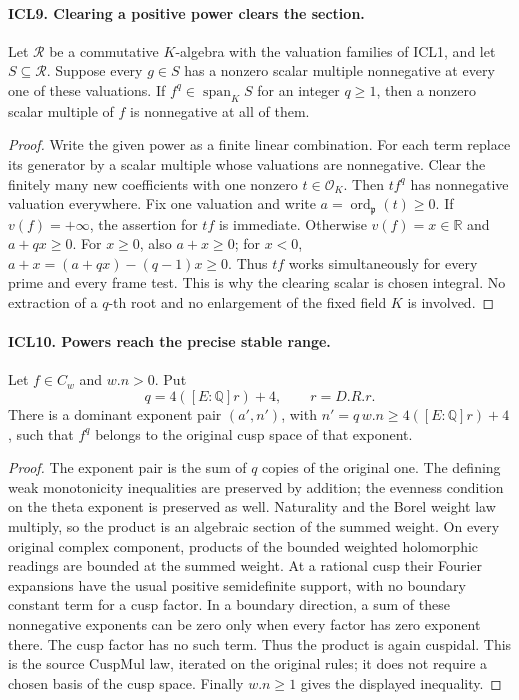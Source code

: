 \documentclass[11pt,a4paper]{article}
\numberwithin{equation}{section}
\theoremstyle{remark}\newtheorem{remark}[theorem]{Remark}
\begin{document}
\paragraph{ICL9. Clearing a positive power clears the section.}
\label{claim:ICL9}
Let \(\mathcal R\) be a commutative \(K\)-algebra with the
valuation families of ICL1, and let \(S\subseteq\mathcal R\).
Suppose every \(g\in S\) has a nonzero scalar multiple
nonnegative at every one of these valuations.  If
\(f^q\in\operatorname{span}_K S\) for an integer \(q\geq1\),
then a nonzero scalar multiple of \(f\) is nonnegative at
all of them.
\begin{proof}
Write the given power as a finite linear combination.  For
each term replace its generator by a scalar multiple whose
valuations are nonnegative.  Clear the finitely many new
coefficients with one nonzero \(t\in\mathcal O_K\).
Then \(t f^q\) has nonnegative valuation everywhere.  Fix
one valuation and write \(a=\operatorname{ord}_{\mathfrak p}(t)\geq0\).
If \(v(f)=+\infty\), the assertion for \(tf\) is immediate.
Otherwise \(v(f)=x\in\mathbb R\) and \(a+qx\geq0\).
For \(x\geq0\), also \(a+x\geq0\); for \(x<0\),
\(a+x=(a+qx)-(q-1)x\geq0\).  Thus \(tf\) works
simultaneously for every prime and every frame test.
This is why the clearing scalar is chosen integral.
No extraction of a \(q\)-th root and no enlargement of
the fixed field \(K\) is involved.
\end{proof}

\paragraph{ICL10. Powers reach the precise stable range.}
\label{claim:ICL10}
Let \(f\in C_w\) and \(w.n>0\).  Put
\[
 q=4([E:\mathbb Q]r)+4,\qquad r=D.R.r.
\]
There is a dominant exponent pair \((a',n')\), with
\(n'=q\,w.n\geq4([E:\mathbb Q]r)+4\), such that
\(f^q\) belongs to the original cusp space of that exponent.
\begin{proof}
The exponent pair is the sum of \(q\) copies of the original
one.  The defining weak monotonicity inequalities are
preserved by addition; the evenness condition on the theta
exponent is preserved as well.  Naturality and the Borel
weight law multiply, so the product is an algebraic section
of the summed weight.  On every original complex component,
products of the bounded weighted holomorphic readings are
bounded at the summed weight.  At a rational cusp their
Fourier expansions have the usual positive semidefinite
support, with no boundary constant term for a cusp factor.
In a boundary direction, a sum of these nonnegative
exponents can be zero only when every factor has zero
exponent there.  The cusp factor has no such term.  Thus the
product is again cuspidal.  This is the source
\(\mathrm{CuspMul}\) law, iterated on the original rules;
it does not require a chosen basis of the cusp space.
Finally \(w.n\geq1\) gives the displayed inequality.
\end{proof}
\end{document}
